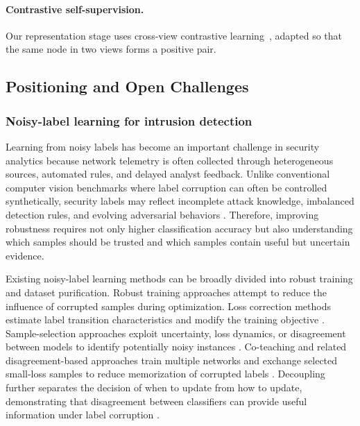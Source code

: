 \documentclass[preprint,3p,times]{elsarticle}
\begin{document}
\paragraph{Contrastive self-supervision.}
Our representation stage uses cross-view contrastive
learning~\cite{chen2020simclr}, adapted so that the same node in two views forms a
positive pair.


\subsection{Positioning and Open Challenges}

\subsubsection*{Noisy-label learning for intrusion detection}

Learning from noisy labels has become an important challenge in security
analytics because network telemetry is often collected through heterogeneous
sources, automated rules, and delayed analyst feedback. Unlike conventional
computer vision benchmarks where label corruption can often be controlled
synthetically, security labels may reflect incomplete attack knowledge,
imbalanced detection rules, and evolving adversarial behaviors
\cite{guerra2022datasets,qing2023lowquality}. Therefore, improving robustness
requires not only higher classification accuracy but also understanding which
samples should be trusted and which samples contain useful but uncertain evidence.

Existing noisy-label learning methods can be broadly divided into robust
training and dataset purification. Robust training approaches attempt to reduce
the influence of corrupted samples during optimization. Loss correction methods
estimate label transition characteristics and modify the training objective
\cite{zhao2021enhancing}. Sample-selection approaches exploit uncertainty,
loss dynamics, or disagreement between models to identify potentially noisy
instances \cite{xia2021sample,liu2021metric}. Co-teaching and related
disagreement-based approaches train multiple networks and exchange selected
small-loss samples to reduce memorization of corrupted labels
\cite{han2018coteaching,yu2019coteachingplus}. Decoupling further separates the
decision of when to update from how to update, demonstrating that disagreement
between classifiers can provide useful information under label corruption
\cite{malach2017decoupling}.
\end{document}
